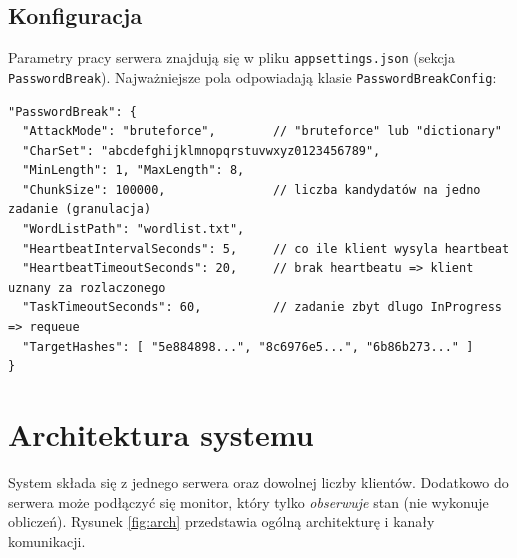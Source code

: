 \documentclass[11pt,a4paper]{article}
\begin{document}
\subsection{Konfiguracja}
Parametry pracy serwera znajdują się w pliku \texttt{appsettings.json} (sekcja \texttt{PasswordBreak}).
Najważniejsze pola odpowiadają klasie \texttt{PasswordBreakConfig}:

\begin{listing}[H]
\begin{verbatim}
"PasswordBreak": {
  "AttackMode": "bruteforce",        // "bruteforce" lub "dictionary"
  "CharSet": "abcdefghijklmnopqrstuvwxyz0123456789",
  "MinLength": 1, "MaxLength": 8,
  "ChunkSize": 100000,               // liczba kandydatów na jedno zadanie (granulacja)
  "WordListPath": "wordlist.txt",
  "HeartbeatIntervalSeconds": 5,     // co ile klient wysyla heartbeat
  "HeartbeatTimeoutSeconds": 20,     // brak heartbeatu => klient uznany za rozlaczonego
  "TaskTimeoutSeconds": 60,          // zadanie zbyt dlugo InProgress => requeue
  "TargetHashes": [ "5e884898...", "8c6976e5...", "6b86b273..." ]
}
\end{verbatim}
\caption{Fragment konfiguracji serwera (\texttt{appsettings.json}).}
\end{listing}

\section{Architektura systemu}

System składa się z jednego serwera oraz dowolnej liczby klientów. Dodatkowo do serwera może
podłączyć się monitor, który tylko \emph{obserwuje} stan (nie wykonuje obliczeń). Rysunek
\ref{fig:arch} przedstawia ogólną architekturę i kanały komunikacji.
\end{document}
